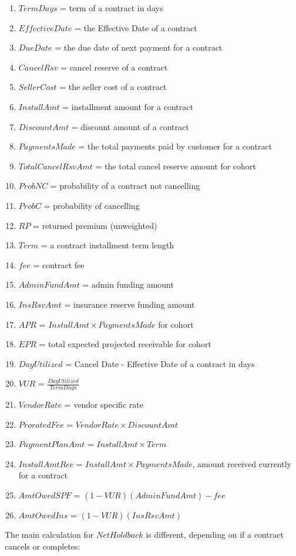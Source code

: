 \documentclass[titlepage]{article}
\begin{document}
\begin{enumerate}
	\item $TermDays$ = term of a contract in days
	\item $EffectiveDate$ = the Effective Date of a contract
	\item $DueDate$ = the due date of next payment for a contract
	\item $CancelRsv$ = cancel reserve of a contract
	\item $SellerCost$ = the seller cost of a contract
	\item $InstallAmt$ = installment amount for a contract
	\item $DiscountAmt$ = discount amount of a contract
	\item $PaymentsMade$ = the total payments paid by customer for a contract
	\item $TotalCancelRsvAmt$ = the total cancel reserve amount for cohort
	\item $ProbNC$ = probability of a contract not cancelling
	\item $ProbC$ = probability of cancelling
	\item $RP$ = returned premium (unweighted)
	\item $Term$ = a contract installment term length
	\item $fee$ = contract fee
	\item $AdminFundAmt$ = admin funding amount
	\item $InsRsvAmt$ = insurance reserve funding amount
	\item $APR$ = $InstallAmt \times PaymentsMade$ for cohort
	\item $EPR$ = total expected projected receivable for cohort
	\item $DayUtilized$ = Cancel Date - Effective Date of a contract in days
	\item $VUR$ = $\frac{DayUtilized}{TermDays}$
	\item $VendorRate$ = vendor specific rate
	\item $ProratedFee$ = $VendorRate \times DiscountAmt$
	\item $PaymentPlanAmt$ = $InstallAmt \times Term$
	\item $InstallAmtRec$ = $InstallAmt \times PaymentsMade$, amount received currently for a contract
	\item $AmtOwedSPF$ = $(1-VUR)(AdminFundAmt) - fee$
	\item $AmtOwedIns$ = $(1-VUR)(InsRsvAmt)$
\end{enumerate}
The main calculation for $NetHoldback$ is different, depending on if a contract cancels or completes:
\end{document}
